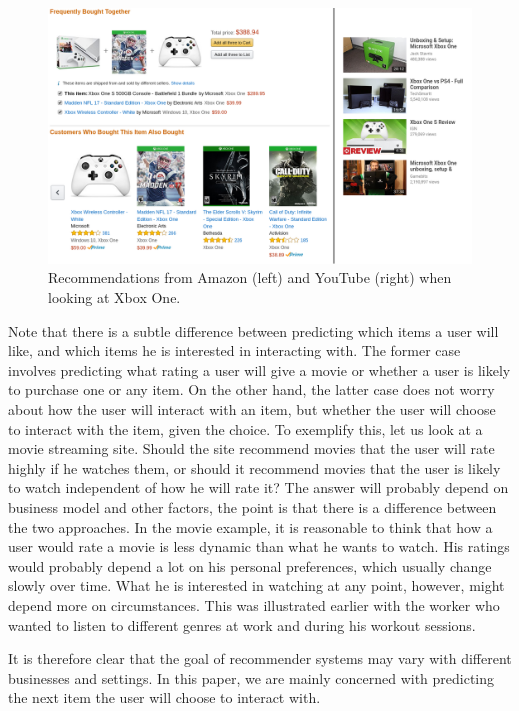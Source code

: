 \begin{figure}[htp]
	\centering
	\includegraphics[width=1.1\textwidth]{fig/recsys_example_xbox.png}
	\caption{Recommendations from Amazon (left) and YouTube (right) when looking at Xbox One.}
	\label{fig:recsys-example-xbox}
\end{figure}

Note that there is a subtle difference between predicting which items a user will like, and which items he is interested in interacting with. The former case involves predicting what rating a user will give a movie or whether a user is likely to purchase one or any item. On the other hand, the latter case does not worry about how the user will interact with an item, but whether the user will choose to interact with the item, given the choice. To exemplify this, let us look at a movie streaming site. Should the site recommend movies that the user will rate highly if he watches them, or should it recommend movies that the user is likely to watch independent of how he will rate it? The answer will probably depend on business model and other factors, the point is that there is a difference between the two approaches. In the movie example, it is reasonable to think that how a user would rate a movie is less dynamic than what he wants to watch. His ratings would probably depend a lot on his personal preferences, which usually change slowly over time. What he is interested in watching at any point, however, might depend more on circumstances. This was illustrated earlier with the worker who wanted to listen to different genres at work and during his workout sessions.

It is therefore clear that the goal of recommender systems may vary with different businesses and settings. In this paper, we are mainly concerned with predicting the next item the user will choose to interact with.

